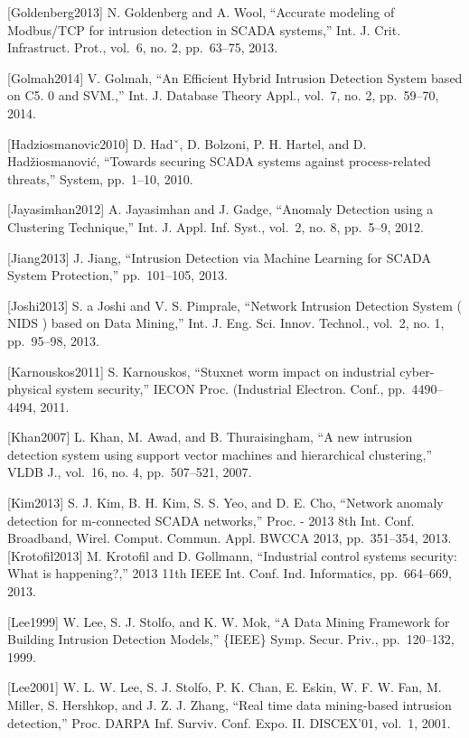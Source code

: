\documentclass[12pt,]{article}
\begin{document}
{[}Goldenberg2013{]} N. Goldenberg and A. Wool, ``Accurate modeling of
Modbus/TCP for intrusion detection in SCADA systems,'' Int. J. Crit.
Infrastruct. Prot., vol.~6, no. 2, pp.~63--75, 2013.

{[}Golmah2014{]} V. Golmah, ``An Efficient Hybrid Intrusion Detection
System based on C5. 0 and SVM.,'' Int. J. Database Theory Appl., vol.~7,
no. 2, pp.~59--70, 2014.

{[}Hadziosmanovic2010{]} D. Hadˇ, D. Bolzoni, P. H. Hartel, and D.
Hadžiosmanović, ``Towards securing SCADA systems against process-related
threats,'' System, pp.~1--10, 2010.

{[}Jayasimhan2012{]} A. Jayasimhan and J. Gadge, ``Anomaly Detection
using a Clustering Technique,'' Int. J. Appl. Inf. Syst., vol.~2, no. 8,
pp.~5--9, 2012.

{[}Jiang2013{]} J. Jiang, ``Intrusion Detection via Machine Learning for
SCADA System Protection,'' pp.~101--105, 2013.

{[}Joshi2013{]} S. a Joshi and V. S. Pimprale, ``Network Intrusion
Detection System ( NIDS ) based on Data Mining,'' Int. J. Eng. Sci.
Innov. Technol., vol.~2, no. 1, pp.~95--98, 2013.

{[}Karnouskos2011{]} S. Karnouskos, ``Stuxnet worm impact on industrial
cyber-physical system security,'' IECON Proc. (Industrial Electron.
Conf., pp.~4490--4494, 2011.

{[}Khan2007{]} L. Khan, M. Awad, and B. Thuraisingham, ``A new intrusion
detection system using support vector machines and hierarchical
clustering,'' VLDB J., vol.~16, no. 4, pp.~507--521, 2007.

{[}Kim2013{]} S. J. Kim, B. H. Kim, S. S. Yeo, and D. E. Cho, ``Network
anomaly detection for m-connected SCADA networks,'' Proc. - 2013 8th
Int. Conf. Broadband, Wirel. Comput. Commun. Appl. BWCCA 2013,
pp.~351--354, 2013. {[}Krotofil2013{]} M. Krotofil and D. Gollmann,
``Industrial control systems security: What is happening?,'' 2013 11th
IEEE Int. Conf. Ind. Informatics, pp.~664--669, 2013.

{[}Lee1999{]} W. Lee, S. J. Stolfo, and K. W. Mok, ``A Data Mining
Framework for Building Intrusion Detection Models,'' \{IEEE\} Symp.
Secur. Priv., pp.~120--132, 1999.

{[}Lee2001{]} W. L. W. Lee, S. J. Stolfo, P. K. Chan, E. Eskin, W. F. W.
Fan, M. Miller, S. Hershkop, and J. Z. J. Zhang, ``Real time data
mining-based intrusion detection,'' Proc. DARPA Inf. Surviv. Conf. Expo.
II. DISCEX'01, vol.~1, 2001.
\end{document}
